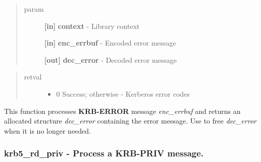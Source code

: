 \documentclass[letterpaper,10pt,english]{sphinxmanual}
\begin{document}
\begin{fulllineitems}
\label{appdev/refs/api/krb5_rd_error:c.krb5_rd_error}
\end{fulllineitems}

\begin{quote}\begin{description}
\item[{param}] \leavevmode
\textbf{{[}in{]}} \textbf{context} - Library context

\textbf{{[}in{]}} \textbf{enc\_errbuf} - Encoded error message

\textbf{{[}out{]}} \textbf{dec\_error} - Decoded error message

\end{description}\end{quote}
\begin{quote}\begin{description}
\item[{retval}] \leavevmode\begin{itemize}
\item {} 
0   Success; otherwise - Kerberos error codes

\end{itemize}

\end{description}\end{quote}

This function processes \textbf{KRB-ERROR} message \emph{enc\_errbuf} and returns an allocated structure \emph{dec\_error} containing the error message. Use {\hyperref[appdev/refs/api/krb5_free_error:c.krb5_free_error]{}} to free \emph{dec\_error} when it is no longer needed.


\subsubsection{krb5\_rd\_priv -  Process a KRB-PRIV message.}
\label{appdev/refs/api/krb5_rd_priv:krb5-rd-priv-process-a-krb-priv-message}\label{appdev/refs/api/krb5_rd_priv::doc}
\end{document}

